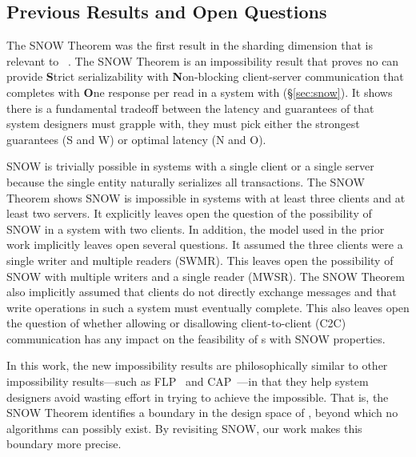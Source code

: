 \subsection{Previous Results and Open Questions}
The SNOW Theorem was the first result in the sharding dimension that is relevant to \rots{}~\cite{SNOW2016}.
The SNOW Theorem is an impossibility result that proves no \rot{} can provide \textbf{S}trict serializability with \textbf{N}on-blocking client-server communication that completes with \textbf{O}ne response per read in a system with \wotsSNOW{} (\S\ref{sec:snow}).
It shows there is a fundamental tradeoff between the latency and guarantees of \rots{} that system designers must grapple with, they must pick either the strongest guarantees (S and W) or optimal latency (N and O).

SNOW is trivially possible in systems with a single client or a single server because the single entity naturally serializes all transactions.
The SNOW Theorem shows SNOW is impossible in systems with at least three clients and at least two servers.
It explicitly leaves open the question of the possibility of SNOW in a system with two clients.
{\color{blue}
In addition, the model used in the prior work implicitly leaves open several questions.
It assumed the three clients were a single writer and multiple readers (SWMR).
This leaves open the possibility of SNOW with multiple writers and a single reader (MWSR).
The SNOW Theorem also implicitly assumed that clients do not directly exchange messages and that write operations in such a system must eventually complete.
This also leaves open the question of whether allowing or disallowing client-to-client (C2C) communication has any impact on the feasibility of \rot{}s with SNOW properties.
}

In this work, the new impossibility results %
are philosophically similar to other impossibility results---such as FLP~\cite{Fischer:pds1983} and CAP~\cite{Brewer:pdc2000, Gilbert:sigact2002}---in that they help system designers avoid wasting effort in trying to achieve the impossible. That is, the SNOW Theorem identifies a boundary in the design space of \rots{}, beyond which no algorithms can possibly exist. By revisiting SNOW, our work makes this boundary more precise.



